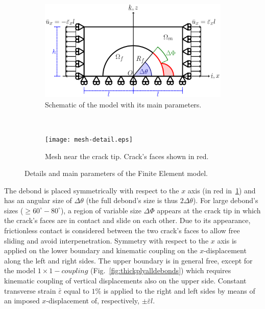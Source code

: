 \documentclass[review]{elsarticle}
\begin{document}
\begin{figure}[!h]
\centering
    \begin{subfigure}[b]{0.55\textwidth}
        \includegraphics[width=\textwidth]{RUC.pdf}
        \caption{Schematic of the model with its main parameters.}\label{subfig:modelschem}
    \end{subfigure} ~
    \begin{subfigure}[b]{0.4\textwidth}
        \texttt{[image: mesh-detail.eps]}
        \caption{Mesh near the crack tip. Crack's faces shown in red.}\label{subfig:meshdetail}
    \end{subfigure}

\caption{Details and main parameters of the Finite Element model.}\label{fig:FEmodel}
\end{figure}

The debond is placed symmetrically with respect to the $x$ axis (in red in~\ref{subfig:modelschem}) and has an angular size of $\Delta\theta$ (the full debond's size is thus $2\Delta\theta$). For large debond's sizes ($\geq 60^{\circ}-80^{\circ}$), a region of variable size $\Delta\Phi$ appears at the crack tip in which the crack's faces are in contact and slide on each other. Due to its appearance, frictionless contact is considered between the two crack's faces to allow free sliding and avoid interpenetration. Symmetry with respect to the $x$ axis is applied on the lower boundary and kinematic coupling on the $x$-displacement along the left and right sides. The upper boundary is in general free, except for the model $1\times 1-coupling$ (Fig.~\ref{fig:thickplyalldebonds}) which requires kinematic coupling of vertical displacements also on the upper side. Constant transverse strain $\bar{\varepsilon}$ equal to $1\%$ is applied to the right and left sides by means of an imposed $x$-displacement of, respectively, $\pm\bar{\varepsilon}l$.
\end{document}
